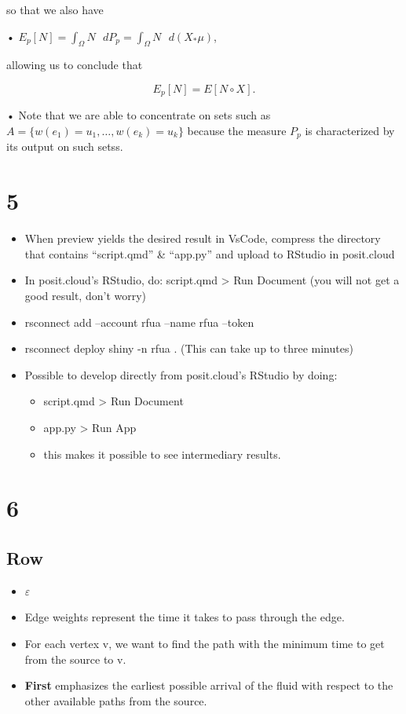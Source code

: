 \documentclass[
  letterpaper,
  DIV=11,
  numbers=noendperiod]{scrartcl}
\providecommand{\tightlist}{%
  \setlength{\itemsep}{0pt}\setlength{\parskip}{0pt}}\usepackage{longtable,booktabs,array}
\begin{document}
so that we also have

•⁠
⁠\(E_p[N] = \int_{\Omega} N \text{ } dP_p = \int_{\Omega} N \text{ } d(X_*\mu)\),

allowing us to conclude that

\[E_p[N] = E[N \circ X].\]

•⁠ ⁠Note that we are able to concentrate on sets such as
\(A = \{w(e_1) = u_1, \ldots, w(e_k) = u_k\}\) because the measure
\(P_p\) is characterized by its output on such setss.

\section{5}\label{section-7}

\begin{itemize}
\item
  When preview yields the desired result in VsCode, compress the
  directory that contains ``script.qmd'' \& ``app.py'' and upload to
  RStudio in posit.cloud
\item
  In posit.cloud's RStudio, do: script.qmd \textgreater{} Run Document
  (you will not get a good result, don't worry)
\item
  rsconnect add --account rfua --name rfua --token
\item
  rsconnect deploy shiny -n rfua . (This can take up to three minutes)
\item
  Possible to develop directly from posit.cloud's RStudio by doing:

  \begin{itemize}
  \tightlist
  \item
    script.qmd \textgreater{} Run Document
  \item
    app.py \textgreater{} Run App
  \item
    this makes it possible to see intermediary results.
  \end{itemize}
\end{itemize}

\section{6}\label{section-8}

\subsection{Row}\label{row-1}

\begin{itemize}
\item
  \(\varepsilon\)
\item
  Edge weights represent the time it takes to pass through the edge.
\item
  For each vertex v, we want to find the path with the minimum time to
  get from the source to v.
\item
  \textbf{First} emphasizes the earliest possible arrival of the fluid
  with respect to the other available paths from the source.
\end{itemize}
\end{document}
